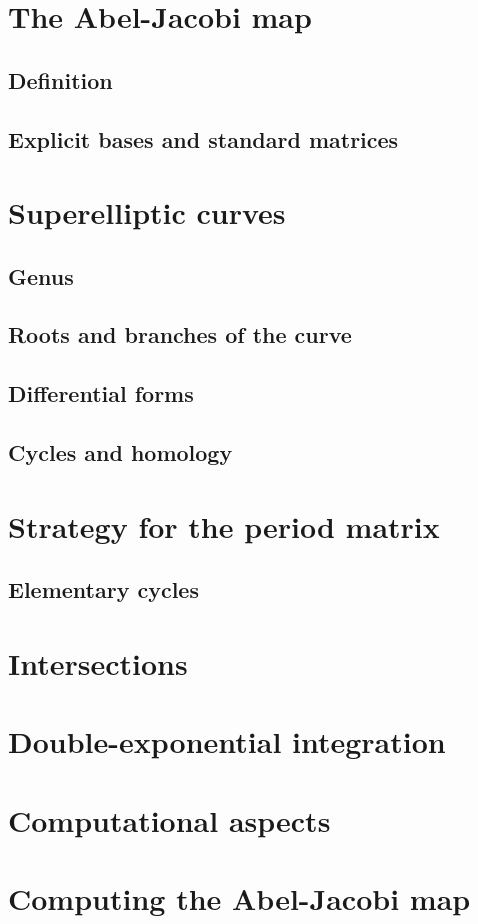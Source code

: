 

\section{The Abel-Jacobi map}

  \subsection{Definition}

  \subsection{Explicit bases and standard matrices}

\section{Superelliptic curves}

  \subsection{Genus}

  \subsection{Roots and branches of the curve}

  \subsection{Differential forms}

  \subsection{Cycles and homology}

\section{Strategy for the period matrix}

  \subsection{Elementary cycles}

\section{Intersections}

\section{Double-exponential integration}

\section{Computational aspects}

\section{Computing the Abel-Jacobi map}
